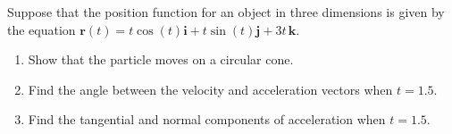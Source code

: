 \documentclass{exercises}
\begin{document}
Suppose that the position function for an object in three dimensions is given by the equation $\mathbf{r}(t)=t\cos(t)\mathbf{i}+t\sin(t)\mathbf{j}+3t\,\mathbf{k}$.

\begin{enumerate}[resume]
\item Show that the particle moves on a circular cone.
\item Find the angle between the velocity and acceleration vectors when $t=1.5$.
\item Find the tangential and normal components of acceleration when $t=1.5$.
\end{enumerate}
\end{document}
